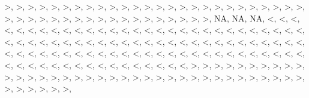 \documentclass[12pt,]{article}
\begin{document}
\textgreater{}, \textgreater{}, \textgreater{}, \textgreater{},
\textgreater{}, \textgreater{}, \textgreater{}, \textgreater{},
\textgreater{}, \textgreater{}, \textgreater{}, \textgreater{},
\textgreater{}, \textgreater{}, \textgreater{}, \textgreater{},
\textgreater{}, \textgreater{}, \textgreater{}, \textgreater{},
\textgreater{}, \textgreater{}, \textgreater{}, \textgreater{},
\textgreater{}, \textgreater{}, \textgreater{}, \textgreater{},
\textgreater{}, \textgreater{}, \textgreater{}, \textgreater{},
\textgreater{}, \textgreater{}, \textgreater{}, \textgreater{},
\textgreater{}, \textgreater{}, \textgreater{}, \textgreater{},
\textgreater{}, \textgreater{}, \textgreater{}, \textgreater{}, NA, NA,
NA, \textless{}, \textless{}, \textless{}, \textless{}, \textless{},
\textless{}, \textless{}, \textless{}, \textless{}, \textless{},
\textless{}, \textless{}, \textless{}, \textless{}, \textless{},
\textless{}, \textless{}, \textless{}, \textless{}, \textless{},
\textless{}, \textless{}, \textless{}, \textless{}, \textless{},
\textless{}, \textless{}, \textless{}, \textless{}, \textless{},
\textless{}, \textless{}, \textless{}, \textless{}, \textless{},
\textless{}, \textless{}, \textless{}, \textless{}, \textless{},
\textless{}, \textless{}, \textless{}, \textless{}, \textless{},
\textless{}, \textless{}, \textless{}, \textless{}, \textless{},
\textless{}, \textless{}, \textless{}, \textless{}, \textless{},
\textless{}, \textless{}, \textless{}, \textless{}, \textless{},
\textless{}, \textless{}, \textless{}, \textless{}, \textless{},
\textless{}, \textless{}, \textless{}, \textless{}, \textless{},
\textless{}, \textless{}, \textless{}, \textless{}, \textless{},
\textless{}, \textless{}, \textless{}, \textless{}, \textless{},
\textless{}, \textless{}, \textless{}, \textless{}, \textless{},
\textless{}, \textless{}, \textless{}, \textless{}, \textless{},
\textless{}, \textless{}, \textless{}, \textless{}, \textless{},
\textless{}, \textless{}, \textgreater{}, \textgreater{},
\textgreater{}, \textgreater{}, \textgreater{}, \textgreater{},
\textgreater{}, \textgreater{}, \textgreater{}, \textgreater{},
\textgreater{}, \textgreater{}, \textgreater{}, \textgreater{},
\textgreater{}, \textgreater{}, \textgreater{}, \textgreater{},
\textgreater{}, \textgreater{}, \textgreater{}, \textgreater{},
\textgreater{}, \textgreater{}, \textgreater{}, \textgreater{},
\textgreater{}, \textgreater{}, \textgreater{}, \textgreater{},
\textgreater{}, \textgreater{}, \textgreater{}, \textgreater{},
\textgreater{}, \textgreater{}, \textgreater{}, \textgreater{},
\textgreater{}, \textgreater{}, \textgreater{}, \textgreater{},
\end{document}
